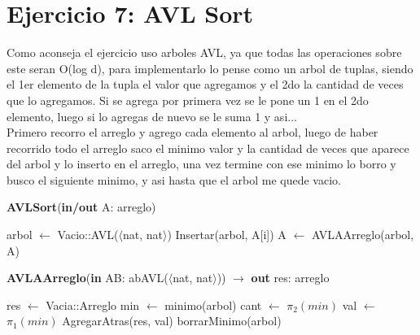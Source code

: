 \section{Ejercicio 7: AVL Sort}
Como aconseja el ejercicio uso arboles AVL, ya que todas las operaciones sobre este seran O(log d), para implementarlo lo pense como un arbol de tuplas, siendo el 1er elemento de la tupla el valor que agregamos y el 2do la cantidad de veces que lo agregamos. Si se agrega por primera vez se le pone un 1 en el 2do elemento, luego si lo agregas de nuevo se le suma 1 y asi...\\
Primero recorro el arreglo y agrego cada elemento al arbol, luego de haber recorrido todo el arreglo saco el minimo valor y la cantidad de veces que aparece del arbol y lo inserto en el arreglo, una vez termine con ese minimo lo borro y busco el siguiente minimo, y asi hasta que el arbol me quede vacio.
\begin{algorithm}[H]
\caption{
    \textbf{AVLSort}(\textbf{in/out} A: arreglo)
}
    \begin{algorithmic}[1]
        \State arbol $\gets$ Vacio::AVL($\langle$nat, nat$\rangle$)
            \State Insertar(arbol, A[i])
        \EndFor
        \State A $\gets$ AVLAArreglo(arbol, A)
    \end{algorithmic}
\end{algorithm}

\begin{algorithm}[H]
\caption{
    \textbf{AVLAArreglo}(\textbf{in} AB: abAVL($\langle$nat, nat$\rangle$)) $\to$ \textbf{out} res: arreglo
}
    \begin{algorithmic}[1]
        \State res $\gets$ Vacia::Arreglo 
         
            \State min $\gets$ minimo(arbol) 
            \State cant $\gets$ $\pi_{2}(min)$ 
            \State val $\gets$ $\pi_{1}(min)$ 
             
                \State AgregarAtras(res, val) 
            \EndFor
            \State borrarMinimo(arbol)  
        \EndWhile
        
    \end{algorithmic}
\end{algorithm}